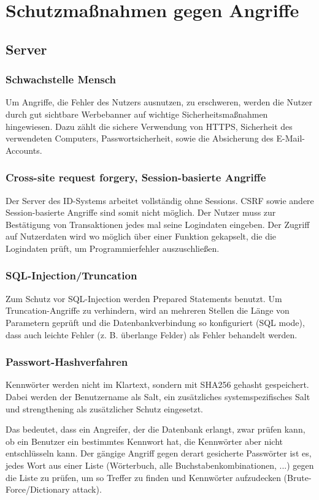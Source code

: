 \documentclass[parskip=half]{scrartcl}
\begin{document}
\section{Schutzmaßnahmen gegen Angriffe}
\subsection{Server}
\subsubsection{Schwachstelle Mensch}
Um Angriffe, die Fehler des Nutzers ausnutzen, zu erschweren, werden die Nutzer durch gut sichtbare Werbebanner auf wichtige Sicherheitsmaßnahmen hingewiesen.
Dazu zählt die sichere Verwendung von HTTPS, Sicherheit des verwendeten Computers, Passwortsicherheit, sowie die Absicherung des E-Mail-Accounts.

\subsubsection{Cross-site request forgery, Session-basierte Angriffe}
Der Server des ID-Systems arbeitet vollständig ohne Sessions. CSRF sowie andere Session-basierte Angriffe sind somit nicht möglich.
Der Nutzer muss zur Bestätigung von Transaktionen jedes mal seine Logindaten eingeben.
Der Zugriff auf Nutzerdaten wird wo möglich über einer Funktion gekapselt, die die Logindaten prüft, um Programmierfehler auszuschließen.

\subsubsection{SQL-Injection/Truncation}
Zum Schutz vor SQL-Injection werden Prepared Statements benutzt.
Um Truncation-Angriffe zu verhindern, wird an mehreren Stellen die Länge von Parametern geprüft
und die Datenbankverbindung so konfiguriert (SQL mode), dass auch leichte Fehler (z. B. überlange Felder) als Fehler behandelt werden.

\subsubsection{Passwort-Hashverfahren}
\label{sec:pwhash}
Kennwörter werden nicht im Klartext, sondern mit SHA256 gehasht gespeichert.
Dabei werden der Benutzername als Salt, ein zusätzliches systemspezifisches Salt und strengthening als zusätzlicher Schutz eingesetzt.

Das bedeutet, dass ein Angreifer, der die Datenbank erlangt, zwar prüfen kann, ob ein Benutzer ein bestimmtes Kennwort hat,
die Kennwörter aber nicht entschlüsseln kann.
Der gängige Angriff gegen derart gesicherte Passwörter ist es, jedes Wort aus einer Liste (Wörterbuch, alle Buchstabenkombinationen, ...)
gegen die Liste zu prüfen, um so Treffer zu finden und Kennwörter aufzudecken (Brute-Force/Dictionary attack).
\end{document}
